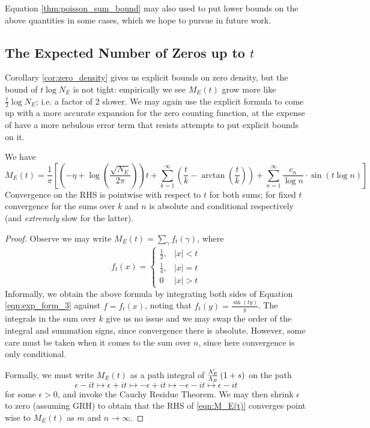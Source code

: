 Equation \ref{thm:poisson_sum_bound} may also used to put lower bounds on the above quantities in some cases, which we hope to pursue in future work.

\newpage
\subsection{The Expected Number of Zeros up to $t$}

Corollary \ref{cor:zero_density} gives us explicit bounds on zero density, but the bound of $t \log N_E$ is not tight: empirically we see $M_E(t)$ grow more like $\frac{t}{2}\log N_E$; i.e. a factor of $2$ slower. We may again use the explicit formula to come up with a more accurate expansion for the zero counting function, at the expense of have a more nebulous error term that resists attempts to put explicit bounds on it.

\begin{proposition}[GRH]
We have
\begin{equation}\label{eqn:M_E(t)}
M_E(t) = \frac{1}{\pi}\left[\left(-\eta+\log\left(\frac{\sqrt{N_E}}{2\pi}\right)\right) t + \sum_{k=1}^{\infty} \left(\frac{t}{k} - \arctan\left(\frac{t}{k}\right)\right) + \sum_{n=1}^{\infty} \frac{c_n}{\log n}\cdot \sin(t\log n)\right]
\end{equation}
Convergence on the RHS is pointwise with respect to $t$ for both sums; for fixed $t$ convergence for the sums over $k$ and $n$ is absolute and conditional respectively (and {\it extremely} slow for the latter).
\end{proposition}

\begin{proof}
Observe we may write $M_E(t) = \sum_{\gamma}f_t(\gamma)$, where
\begin{equation}
f_t(x) = \begin{cases} \frac{1}{2}, & |x|<t \\ \frac{1}{4}, & |x| = t \\ 0 & |x|> t \end{cases}
\end{equation}
Informally, we obtain the above formula by integrating both sides of Equation \ref{eqn:exp_form_3} against $f = f_t(x)$, noting that $\hat{f}_t(y) = \frac{\sin(ty)}{y}$. The integrals in the sum over $k$ give us no issue and we may swap the order of the integral and summation signs, since convergence there is absolute. However, some care must be taken when it comes to the sum over $n$, since here convergence is only conditional. 

Formally, we must write $M_E(t)$ as a path integral of $\frac{\Lambda_E^{\prime}}{\Lambda_E}\left(1+s\right)$ on the path
\begin{equation*}
\epsilon-it \mapsto \epsilon+it \mapsto -\epsilon+it \mapsto -\epsilon-it \mapsto \epsilon-it
\end{equation*}
for some $\epsilon>0$, and invoke the Cauchy Residue Theorem. We may then shrink $\epsilon$ to zero (assuming GRH) to obtain that the RHS of \ref{eqn:M_E(t)} converges point wise to $M_E(t)$ as $m$ and $n \to \infty$.
\end{proof}

